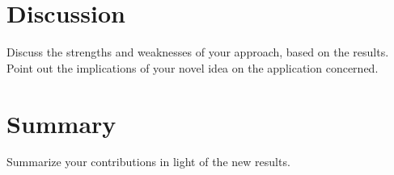 \documentclass[11pt,a4paper]{article}
\begin{document}
\section{Discussion}\label{sec:discussion}
Discuss the strengths and weaknesses of your approach, based on the results. Point out the implications of your novel idea on the application concerned.
\section{Summary}\label{sec:conclusions}
Summarize your contributions in light of the new results.

\end{document}
